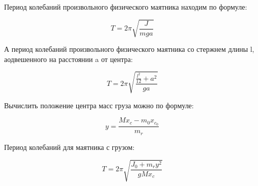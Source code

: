     Период колебаний произвольного физического маятника находим по формуле:
    
\begin{equation} \label{период}
    T = 2\pi\sqrt{\frac{J}{m g a}}
\end{equation}

    А период колебаний произвольного физического маятника со стержнем длины l, аодвешенного  на расстоянии a от центра:
    
\begin{equation} \label{период с а}
    T = 2\pi\sqrt{\frac{\frac{l^2}{12} + a^2}{g a}}
\end{equation}

    Вычислить положение центра масс груза можно по формуле:
   
\begin{equation} \label{центр масс груза}
    y = \frac{M x_{c} - m_0x_{c_0}}{m_r}
\end{equation}

    Период колебаний для маятника с грузом:

\begin{equation}\label{период с грузом}
    T = 2\pi\sqrt{\frac{J_0 + m_r y^2}{g M x_c}}
\end{equation}


